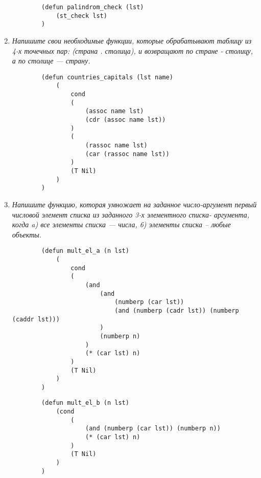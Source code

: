 \begin{enumerate}[wide=0pt]
\begin{lstlisting}
		(defun palindrom_check (lst)
			(st_check lst)
		)
	\end{lstlisting}

	\item  \textit{Напишите свои необходимые функции, 
	которые обрабатывают таблицу из
	4-х точечных пар:
	(страна . столица), и возвращают по стране - столицу, а по столице —
	страну.}
	
	\begin{lstlisting}
		(defun countries_capitals (lst name)
			(
				cond 
				(
					(assoc name lst)
					(cdr (assoc name lst))
				)
				(
					(rassoc name lst)
					(car (rassoc name lst))
				)
				(T Nil)
			)
		)
	\end{lstlisting}



	\item  \textit{Напишите функцию, которая умножает на заданное число-аргумент
	первый числовой элемент списка из заданного 3-х элементного списка-
	аргумента, когда
	a) все элементы списка --- числа,
	6) элементы списка -- любые объекты.}

	\begin{lstlisting}
		(defun mult_el_a (n lst)
			(
				cond 
				(
					(and
						(and
							(numberp (car lst))
							(and (numberp (cadr lst)) (numberp (caddr lst)))
						)
						(numberp n)
					)
					(* (car lst) n)
				)
				(T Nil)
			)
		)
	\end{lstlisting}


	\begin{lstlisting}
		(defun mult_el_b (n lst)
			(cond 
				(
					(and (numberp (car lst)) (numberp n))
					(* (car lst) n)
				)
				(T Nil)
			)
		)
	\end{lstlisting}

\end{enumerate}